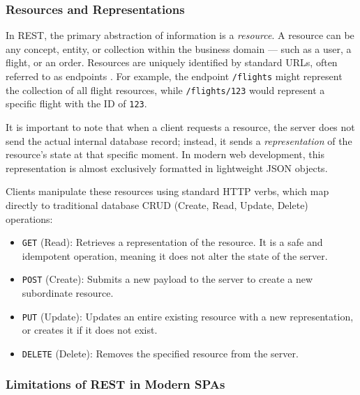\subsubsection{Resources and Representations}

In REST, the primary abstraction of information is a \textit{resource}. A resource can be any concept, entity, or collection within the business domain — such as a user, a flight, or an order. Resources are uniquely identified by standard \gls{URL}s, often referred to as endpoints \cite{aws_rest_api}. For example, the endpoint \texttt{/flights} might represent the collection of all flight resources, while \texttt{/flights/123} would represent a specific flight with the ID of \texttt{123}.

It is important to note that when a client requests a resource, the server does not send the actual internal database record; instead, it sends a \textit{representation} of the resource's state at that specific moment. In modern web development, this representation is almost exclusively formatted in lightweight \gls{JSON} objects.

Clients manipulate these resources using standard HTTP verbs, which map directly to traditional database CRUD (Create, Read, Update, Delete) operations:
\begin{itemize}
    \item \texttt{GET} (Read): Retrieves a representation of the resource. It is a safe and idempotent operation, meaning it does not alter the state of the server.
    \item \texttt{POST} (Create): Submits a new payload to the server to create a new subordinate resource.
    \item \texttt{PUT} (Update): Updates an entire existing resource with a new representation, or creates it if it does not exist.
    \item \texttt{DELETE} (Delete): Removes the specified resource from the server.
\end{itemize}

\subsubsection{Limitations of REST in Modern SPAs}

